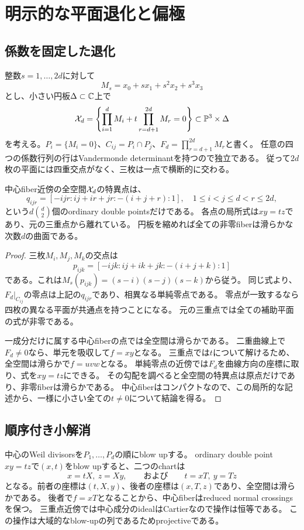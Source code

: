 \section{明示的な平面退化と偏極}\label{sec:degeneration}

\subsection{係数を固定した退化}
整数$s=1,\ldots,2d$に対して
\[
M_s=x_0+s x_1+s^2x_2+s^3x_3
\]
とし、小さい円板$\Delta\subset\mathbb C$上で
\begin{equation}\label{deg:family}
\mathcal X_d=\left\{\prod_{i=1}^{d}M_i+t\prod_{r=d+1}^{2d}M_r=0\right\}
\subset\mathbb P^3\times\Delta
\end{equation}
を考える。$P_i=\{M_i=0\}$、$C_{ij}=P_i\cap P_j$、$F_d=\prod_{r=d+1}^{2d}M_r$と書く。
任意の四つの係数行列の行はVandermonde determinantを持つので独立である。
従って$2d$枚の平面には四重交点がなく、三枚は一点で横断的に交わる。

\begin{proposition}\label{deg:nodes}
中心fiber近傍の全空間$\mathcal X_d$の特異点は、
\[
q_{ijr}=[-ijr:ij+ir+jr:-(i+j+r):1],
\quad 1\le i<j\le d<r\le2d,
\]
という$d\binom d2$個のordinary double pointsだけである。
各点の局所式は$xy=tz$であり、元の三重点から離れている。
円板を縮めれば全ての非零fiberは滑らかな次数$d$の曲面である。
\end{proposition}
\begin{proof}
三枚$M_i,M_j,M_k$の交点は
\[
p_{ijk}=[-ijk:ij+ik+jk:-(i+j+k):1]
\]
である。これは$M_s(p_{ijk})=(s-i)(s-j)(s-k)$から従う。
同じ式より、$F_d|_{C_{ij}}$の零点は上記の$q_{ijr}$であり、相異なる単純零点である。
零点が一致するなら四枚の異なる平面が共通点を持つことになる。
元の三重点では全ての補助平面の式が非零である。

一成分だけに属する中心fiberの点では全空間は滑らかである。
二重曲線上で$F_d\ne0$なら、単元を吸収して$f=xy$となる。
三重点では$t$について解けるため、全空間は滑らかで$f=uvw$となる。
単純零点の近傍では$F_d$を曲線方向の座標に取り、式を$xy=tz$にできる。
その勾配を調べると全空間の特異点は原点だけであり、非零fiberは滑らかである。
中心fiberはコンパクトなので、この局所的な記述から、一様に小さい全ての$t\ne0$について結論を得る。
\end{proof}

\subsection{順序付き小解消}
中心のWeil divisorsを$P_1,\ldots,P_d$の順にblow upする。
ordinary double point $xy=tz$で$(x,t)$をblow upすると、二つのchartは
\[
x=tX,\ z=Xy,
\qquad\text{および}\qquad
t=xT,\ y=Tz
\]
となる。前者の座標は$(t,X,y)$、後者の座標は$(x,T,z)$であり、全空間は滑らかである。
後者で$f=xT$となることから、中心fiberはreduced normal crossingsを保つ。
三重点近傍では中心成分のidealはCartierなので操作は恒等である。
この操作は大域的なblow-upの列であるためprojectiveである。

